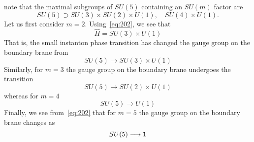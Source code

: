 \documentclass[a4paper,12pt]{article}
\numberwithin{equation}{section}
\theoremstyle{plain}
\begin{document}
note that the maximal subgroups of $SU(5)$ containing an $SU(m)$ factor are 
\begin{equation}
SU(5) \supset SU(3) \times SU(2) \times U(1), \quad SU(4) \times U(1).
\label{eq:202}
\end{equation}
Let us first consider $m=2$. Using~\eqref{eq:202}, we see that 
\begin{equation}
\widehat{H}=SU(3)\times U(1)
\label{eq:203}
\end{equation}
That is, the small instanton phase transition has changed the gauge
group on the boundary brane from
\begin{equation}
SU(5) \longrightarrow SU(3)\times U(1)
\label{eq:204}
\end{equation}
Similarly, for $m=3$ the gauge group on the boundary brane
undergoes the transition
\begin{equation}
SU(5) \longrightarrow SU(2)\times U(1)
\label{eq:205}
\end{equation}
whereas for $m=4$
\begin{equation}
SU(5) \longrightarrow U(1) 
\label{eq:206}
\end{equation}
Finally, we see from~\eqref{eq:202} that for $m=5$ the gauge
group on the boundary brane changes as
\begin{equation}
SU(5) \longrightarrow {\bf 1 \rm}
\label{eq:206A}
\end{equation}

\smallskip

\
\end{document}
